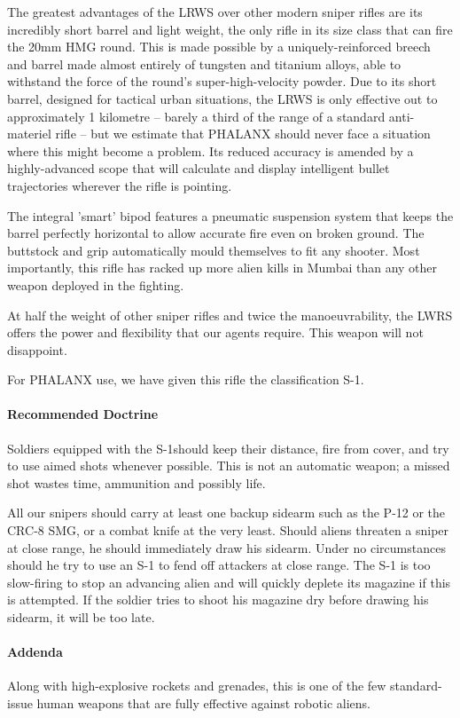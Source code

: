 The greatest advantages of the LRWS over other modern sniper rifles are its incredibly short barrel and light weight, the only rifle in its size class that can fire the 20mm HMG round. This is made possible by a uniquely-reinforced breech and barrel made almost entirely of tungsten and titanium alloys, able to withstand the force of the round's super-high-velocity powder. Due to its short barrel, designed for tactical urban situations, the LRWS is only effective out to approximately 1 kilometre -- barely a third of the range of a standard anti-materiel rifle -- but we estimate that PHALANX should never face a situation where this might become a problem. Its reduced accuracy is amended by a highly-advanced scope that will calculate and display intelligent bullet trajectories wherever the rifle is pointing.

The integral 'smart' bipod features a pneumatic suspension system that keeps the barrel perfectly horizontal to allow accurate fire even on broken ground. The buttstock and grip automatically mould themselves to fit any shooter. Most importantly, this rifle has racked up more alien kills in Mumbai than any other weapon deployed in the fighting.

At half the weight of other sniper rifles and twice the manoeuvrability, the LWRS offers the power and flexibility that our agents require. This weapon will not disappoint.

For PHALANX use, we have given this rifle the classification S-1.
\paragraph*{Recommended Doctrine}
Soldiers equipped with the S-1should keep their distance, fire from cover, and try to use aimed shots whenever possible. This is not an automatic weapon; a missed shot wastes time, ammunition and possibly life.

All our snipers should carry at least one backup sidearm such as the P-12 or the CRC-8 SMG, or a combat knife at the very least. Should aliens threaten a sniper at close range, he should immediately draw his sidearm. Under no circumstances should he try to use an S-1 to fend off attackers at close range. The S-1 is too slow-firing to stop an advancing alien and will quickly deplete its magazine if this is attempted. If the soldier tries to shoot his magazine dry before drawing his sidearm, it will be too late.
\paragraph*{Addenda}
Along with high-explosive rockets and grenades, this is one of the few standard-issue human weapons that are fully effective against robotic aliens.

